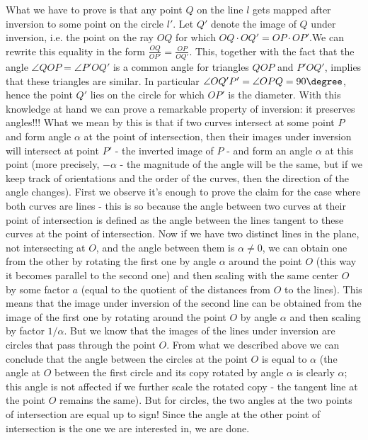 What we have to prove is that any point $Q$ on the line $l$ gets mapped after inversion to some point on the circle $l'$. Let $Q'$ denote the image of $Q$ under inversion, i.e. the point on the ray $OQ$ for which $OQ\cdot OQ'=OP\cdot OP'$.We can rewrite this equality in the form $\frac{OQ}{OP'}=\frac{OP}{OQ'}$. This, together with the fact that the angle $\angle QOP=\angle P'OQ'$ is a common angle for triangles $QOP$ and $P'OQ'$, implies that these triangles are similar. In particular $\angle OQ'P'=\angle OPQ=90\degree$, hence the point $Q'$ lies on the circle for which $OP'$ is the diameter.
With this knowledge at hand we can prove a remarkable property of inversion: it preserves angles!!!
What we mean by this is that if two curves intersect at some point $P$ and form angle $\alpha$ at the point of intersection, then their images under inversion will intersect at point $P'$ - the inverted image of $P$ - and form an angle $\alpha$ at this point (more precisely, $-\alpha$ - the magnitude of the angle will be the same, but if we keep track of orientations and the order of the curves, then the direction of the angle changes).
First we observe it's enough to prove the claim for the case where both curves are lines - this is so because the angle between two curves at their point of intersection is defined as the angle between the lines tangent to these curves at the point of intersection.
Now if we have two distinct lines in the plane, not intersecting at $O$, and the angle between them is $\alpha\neq 0$, we can obtain one from the other by rotating the first one by angle $\alpha$ around the point $O$ (this way it becomes parallel to the second one) and then scaling with the same center $O$ by some factor $a$ (equal to the quotient of the distances from $O$ to the lines).
This means that the image under inversion of the second line can be obtained from the image of the first one by rotating around the point $O$ by angle $\alpha$ and then scaling by factor $1/\alpha$.
But we know that the images of the lines under inversion are circles that pass through the point $O$. From what we described above we can conclude that the angle between the circles at the point $O$ is equal to $\alpha$ (the angle at $O$ between the first circle and its copy rotated by angle $\alpha$ is clearly $\alpha$; this angle is not affected if we further scale the rotated copy - the tangent line at the point $O$ remains the same). But for circles, the two angles at the two points of intersection are equal up to sign! Since the angle at the other point of intersection is the one we are interested in, we are done.
